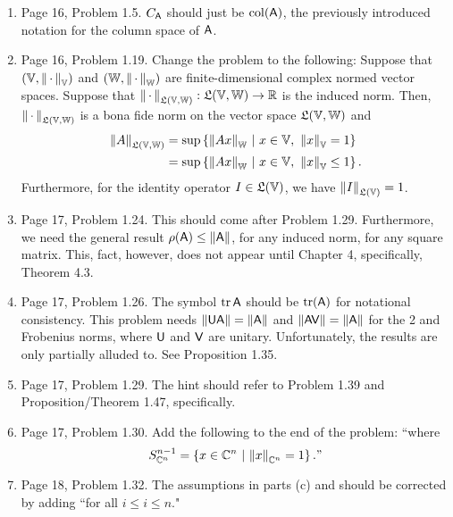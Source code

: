 \documentclass{book}
\begin{document}
\begin{enumerate}
	\item
Page 16, Problem 1.5. $C_{\mathsf{A}}$ should just be ${\rm col}(\mathsf{A})$, the previously introduced notation for the column space of $\mathsf{A}$.

	\item
Page 16, Problem 1.19. Change the problem to the following: Suppose that $({\mathbb V}, \left\| \, \cdot \,  \right\|_{{\mathbb V}})$ and $({\mathbb W}, \left\| \, \cdot \,  \right\|_{{\mathbb W}})$ are finite-dimensional complex normed vector spaces. Suppose that $\left\|  \, \cdot \,  \right\|_{\mathfrak{L}({\mathbb V},{\mathbb W})}: \mathfrak{L}({\mathbb V},{\mathbb W}) \to \mathbb R$ is the induced norm. Then, $\left\|  \, \cdot \,  \right\|_{\mathfrak{L}({\mathbb V},{\mathbb W})}$ is a bona fide norm on the vector space $\mathfrak{L}({\mathbb V},{\mathbb W})$ and
 	\begin{align*}
\nrm{A}_{\mathfrak{L}(\polV,\polW)} & = \sup \left\{ \nrm{Ax}_{\polW} \ \middle| \ x\in\polV, \ \nrm{x}_{\polV} = 1   \right\}
	\\
& = \sup \left\{ \nrm{Ax}_{\polW} \ \middle| \ x\in\polV, \ \nrm{x}_{\polV} \le 1   \right\}.
	\end{align*}
Furthermore, for the identity operator $I\in \mathfrak{L}({\mathbb V})$, we have $\left\| I \right\|_{\mathfrak{L}({\mathbb V})} =1$.

	\item
Page 17, Problem 1.24. This should come after Problem 1.29. Furthermore, we need the general result $\rho(\mathsf{A})\le \left\| \mathsf{A} \right\|$, for any induced norm, for any square matrix. This, fact, however, does not appear until Chapter 4, specifically, Theorem 4.3. 

	\item
Page 17, Problem 1.26. The symbol ${\rm tr}\, \mathsf{A}$ should be ${\rm tr}(\mathsf{A})$ for notational consistency. This problem needs $\left\| \mathsf{U}\mathsf{A} \right\| = \left\| \mathsf{A} \right\|$ and $\left\| \mathsf{A}\mathsf{V} \right\| = \left\| \mathsf{A} \right\|$ for the 2 and Frobenius norms, where $\mathsf{U}$ and $\mathsf{V}$ are unitary. Unfortunately, the results are only partially alluded to. See Proposition 1.35.

	\item
Page 17, Problem 1.29. The hint should refer to Problem 1.39 and Proposition/Theorem 1.47, specifically.
	
	\item
Page 17, Problem 1.30. Add the following to the end of the problem: ``where
	\[
S^{n-1}_{\mathbb C^n} = \left\{x\in \mathbb C^n \ \middle| \ \left\| x \right\|_{\mathbb C^n} = 1 \right\}."
	\]
	
	\item
Page 18, Problem 1.32. The assumptions in parts (c) and should be corrected by adding ``for all $i\le i\le n$."

	\end{enumerate}
	
\end{document}
